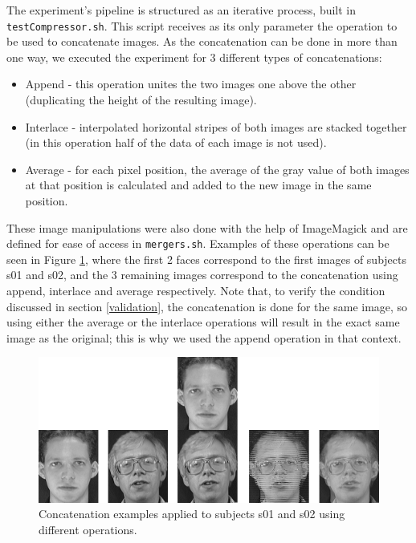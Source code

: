 \documentclass[12pt]{article}
\begin{document}
The experiment's pipeline is structured as an iterative process, built in \texttt{testCompressor.sh}.
This script receives as its only parameter the operation to be used to concatenate images.
As the concatenation can be done in more than one way, we executed the experiment for 3 different types of concatenations:
\vspace{-10pt}
\begin{itemize}[noitemsep]
  \item Append - this operation unites the two images one above the other (duplicating the height of the resulting image).
  \item Interlace - interpolated horizontal stripes of both images are stacked together (in this operation half of the data of each image is not used).
  \item Average - for each pixel position, the average of the gray value of both images at that position is calculated and added to the new image in the same position.
\end{itemize}
\vspace{-10pt}

\newpage
These image manipulations were also done with the help of ImageMagick and are defined for ease of access in \texttt{mergers.sh}.
Examples of these operations can be seen in Figure \ref{fig:3}, where the first 2 faces correspond to the first images of subjects s01 and s02, and the 
3 remaining images correspond to the concatenation using append, interlace and average respectively.
Note that, to verify the condition discussed in section \ref{validation}, the concatenation is done for the same image, so using either the average or the 
interlace operations will result in the exact same image as the original; this is why we used the append operation in that context.

\begin{figure}[H]
  \centering
  \begin{minipage}{.8\textwidth}
    \centering
    \includegraphics[width=\linewidth]{operations_example.png}
  \end{minipage}%
  \caption{Concatenation examples applied to subjects s01 and s02 using different operations.}
  \label{fig:3}
\end{figure}
\end{document}
